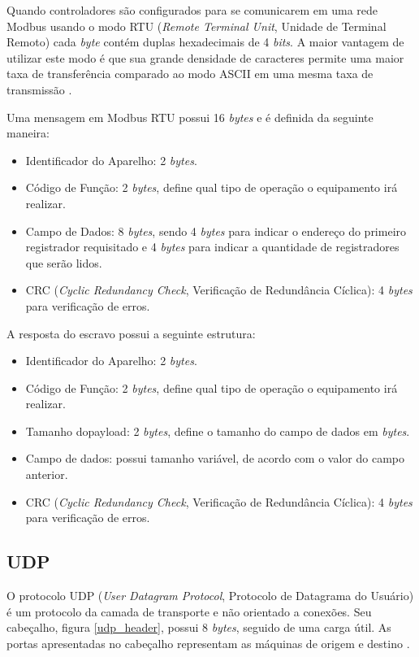     Quando controladores são configurados para se comunicarem em uma rede Modbus usando o modo RTU (\textit{Remote Terminal Unit}, Unidade de Terminal Remoto) cada \textit{byte} contém duplas hexadecimais de 4 \textit{bits}. A maior vantagem de utilizar este modo é que sua grande densidade de caracteres permite uma maior taxa de transferência comparado ao modo ASCII em uma mesma taxa de transmissão \cite{modbus}.

    Uma mensagem em Modbus RTU possui 16 \textit{bytes} e é definida da seguinte maneira:
    \begin{itemize}
        \item Identificador do Aparelho: 2 \textit{bytes}.
        \item Código de Função: 2 \textit{bytes}, define qual tipo de operação o equipamento irá realizar.
        \item Campo de Dados: 8 \textit{bytes}, sendo 4 \textit{bytes} para indicar o endereço do primeiro registrador requisitado e 4 \textit{bytes} para indicar a quantidade de registradores que serão lidos.
        \item CRC (\textit{Cyclic Redundancy Check}, Verificação de Redundância Cíclica): 4 \textit{bytes} para verificação de erros.
    \end{itemize}

    A resposta do escravo possui a seguinte estrutura:

    \begin{itemize}
        \item Identificador do Aparelho: 2 \textit{bytes}.
        \item Código de Função: 2 \textit{bytes}, define qual tipo de operação o equipamento irá realizar.
        \item Tamanho do{payload}: 2 \textit{bytes}, define o tamanho do campo de dados em \textit{bytes}.
        \item Campo de dados: possui tamanho variável, de acordo com o valor do campo anterior.
        \item CRC (\textit{Cyclic Redundancy Check}, Verificação de Redundância Cíclica): 4 \textit{bytes} para verificação de erros.
    \end{itemize}

    \subsection{UDP}
    O protocolo UDP (\textit{User Datagram Protocol}, Protocolo de Datagrama do Usuário) é um protocolo da camada de transporte e não orientado a conexões. Seu cabeçalho, figura \ref{udp_header}, possui 8 \textit{bytes}, seguido de uma carga útil. As portas apresentadas no cabeçalho representam as máquinas de origem e destino \cite{tanenbaum_2002}.

